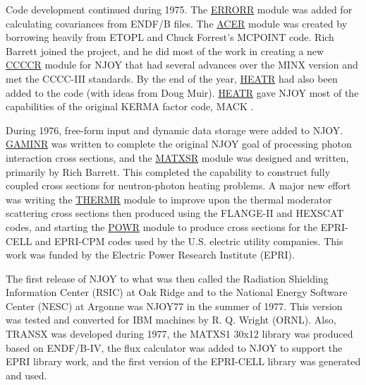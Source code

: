 Code development continued during 1975.  The \hyperlink{sERRORRhy}{ERRORR}
 module was added for calculating covariances
 from ENDF/B files.  The \hyperlink{sACERhy}{ACER}
 module was created by borrowing heavily from
ETOPL and Chuck Forrest's
MCPOINT  code.  Rich Barrett
joined the project, and he did most of the work in creating a new
\hyperlink{sCCCCRhy}{CCCCR} module for NJOY
that had several advances over the MINX version and met the
CCCC-III standards\cite{CCCC3}.  By
the end of the year, \hyperlink{sHEATRhy}{HEATR}
had also been added to the code (with ideas from Doug Muir).
\hyperlink{sHEATRhy}{HEATR} gave NJOY most of the capabilities of
the original KERMA factor code, MACK
\cite{MACK}.

During 1976, free-form input
and dynamic data storage were
added to NJOY.  \hyperlink{sGAMINRhy}{GAMINR}
was written to complete the original NJOY goal of processing
photon interaction cross sections, and the \hyperlink{sMATXSRhy}{MATXSR}
 module was designed and written,
primarily by Rich Barrett.  This completed the capability to
construct fully coupled cross sections for neutron-photon heating
problems.  A major new effort was writing the
\hyperlink{sTHERMRhy}{THERMR}
module to improve upon the thermal moderator scattering cross sections
then produced using the FLANGE-II\cite{FLANGE}
and HEXSCAT\cite{HEXSCAT} codes, and starting the
\hyperlink{sPOWRhy}{POWR} module to produce cross
sections for the EPRI-CELL and EPRI-CPM
 codes used by the U.S. electric utility
companies.  This work was funded by the Electric Power Research
Institute (EPRI).

The first release of NJOY to what was then called the Radiation
Shielding Information Center (RSIC) at Oak Ridge and to the
National Energy Software Center (NESC) at Argonne was
NJOY77 in the summer of 1977.  This
version was tested and converted for IBM machines by
R. Q. Wright (ORNL).  Also, TRANSX
was developed during 1977, the MATXS1 30x12 library
 was produced based on ENDF/B-IV,
the flux calculator was added to NJOY
to support the EPRI library work, and the first version of the
EPRI-CELL library was generated and used.

